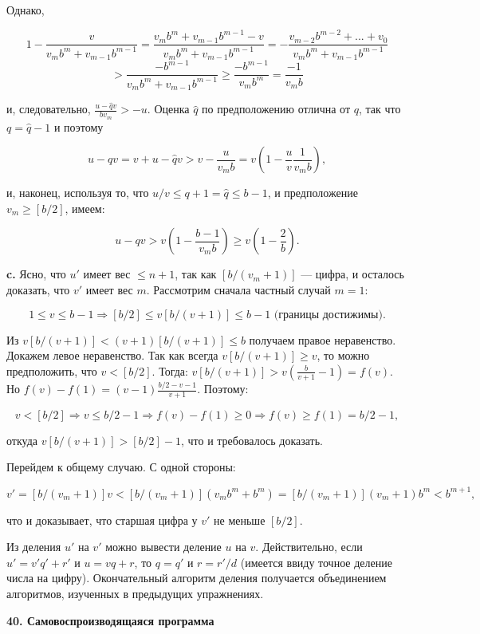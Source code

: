 \documentclass{mai_book}
\begin{document}
\noindent Однако,

$$
1-\dfrac{v}{v_mb^m+v_{m-1}b^{m-1}} = \dfrac{v_mb^m+v_{m-1}b^{m-1}-v}{v_mb^m+v_{m-1}b^{m-1}} = - \dfrac{v_{m-2}b^{m-2}+...+v_0}{v_mb^m+v_{m-1}b^{m-1}}
$$ \linebreak 
$$ > \dfrac{-b^{m-1}}{v_mb^m+v_{m-1}b^{m-1}} \ge \dfrac{-b^{m-1}}{v_mb^m} = \dfrac{-1}{v_mb}
$$

\noindent и, следовательно, $\frac{u-\hat{q}v}{bv_m} > -u$. Оценка $\hat{q}$ по предположению отлична от $q$, так что $q = \hat{q}-1$ и поэтому

\[
u-qv = v+u-\hat{q}v > v-\dfrac{u}{v_mb} = v(1-\dfrac{u}{v}\dfrac{1}{v_mb}),
\]

\noindent и, наконец, используя то, что $u/v \le q+1 = \hat{q} \le b-1$, и предположение $v_m \ge [b/2]$, имеем:

\[
u-qv > v(1-\dfrac{b-1}{v_mb}) \ge v(1-\dfrac{2}{b}).
\]

\textbf{c.} Ясно, что $u'$ имеет вес $\le n+1$, так как $[b/(v_m + 1)]$ — цифра, и осталось доказать, что $v'$ имеет вес $m$. Рассмотрим сначала частный случай $m = 1$:

\[
1 \le v \le b-1 \Longrightarrow [b/2] \le v[b/(v+1)] \le b-1 \text{ (границы достижимы)}.
\]

\noindent Из $v[b/(v+1)] < (v+1)[b/(v+1)] \le b$ получаем правое неравенство. Докажем левое неравенство. Так как всегда $v[b/(v+1)] \ge v$, то можно предположить, что $v<[b/2]$. Тогда: $v[b/(v+1)] > v(\frac{b}{v+1} - 1) = f(v)$. Но $f(v)-f(1) = (v-1)\frac{b/2-v-1}{v+1}$. Поэтому:

\[
v < [b/2] \Longrightarrow v \le b/2-1 \Longrightarrow f(v)-f(1) \ge 0 \Longrightarrow f(v) \ge f(1) = b/2-1,
\]

откуда $v[b/(v+1)] > [b/2]-1$, что и требовалось доказать.

Перейдем к общему случаю. С одной стороны:

\[
v' = [b/(v_m+1)]v < [b/(v_m+1)](v_mb^m+b^m) = [b/(v_m+1)](v_m+1)b^m<b^{m+1},
\]

\noindent что и доказывает, что старшая цифра у $v'$ не меньше $[b/2]$.

Из деления $u'$ на $v'$ можно вывести деление $u$ на $v$. Действительно, если $u'=v'q'+r'$ и $u=vq+r$, то $q=q'$ и $r=r'/d$ (имеется ввиду точное деление числа на цифру). Окончательный алгоритм деления получается объединением алгоритмов, изученных в предыдущих упражнениях.

\pagebreak

\noindent \textbf{40. Самовоспроизводящаяся программа}
\end{document}
